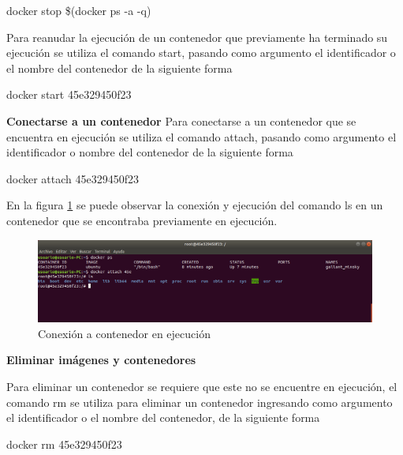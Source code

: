 \begin{commandshell} docker stop \$(docker ps -a -q) \end{commandshell}

Para reanudar la ejecución de un contenedor que previamente ha terminado su ejecución se utiliza el comando start, pasando como argumento el identificador o el nombre del contenedor de la siguiente forma 

\begin{commandshell} docker start 45e329450f23 \end{commandshell}

\textbf{Conectarse a un contenedor}
Para conectarse a un contenedor que se encuentra en ejecución se utiliza el comando attach, pasando como argumento el identificador o nombre del contenedor de la siguiente forma

\begin{commandshell} docker attach 45e329450f23 \end{commandshell}

En la figura \ref{fig:DockerGestion10} se puede observar la conexión y ejecución del comando ls en un contenedor que se encontraba previamente en ejecución.

\begin{figure}[!hbtp]
	\centering
	\includegraphics[width=\linewidth]{Trabajo/RecursosEducativos/RE05_Docker/Gestion_basica/REDocker_Gestion10.png}
	\vspace{-0.2cm}
	\caption{Conexión a contenedor en ejecución}
	\label{fig:DockerGestion10}
\end{figure}

\textbf{Eliminar imágenes y contenedores}

Para eliminar un contenedor se requiere que este no se encuentre en ejecución, el comando rm se utiliza para eliminar un contenedor ingresando como argumento el identificador o el nombre del contenedor, de la siguiente forma
\begin{commandshell} docker rm 45e329450f23 \end{commandshell}

